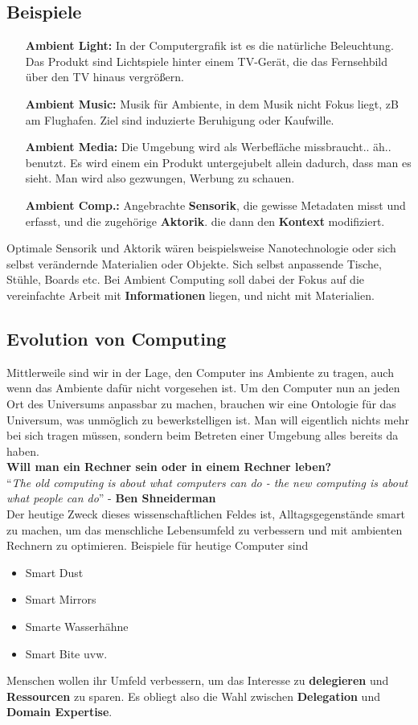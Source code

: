\documentclass[a4paper]{article}
\begin{document}
\subsection{Beispiele}
\begin{itemize}
	\item[\textbf{Ambient Light:}] In der Computergrafik ist es die natürliche Beleuchtung. Das Produkt sind Lichtspiele hinter einem TV-Gerät, die das Fernsehbild über den TV hinaus vergrößern.  
	\item[\textbf{Ambient Music:}] Musik für Ambiente, in dem Musik nicht Fokus liegt, zB am Flughafen. Ziel sind induzierte Beruhigung oder Kaufwille.
	\item[\textbf{Ambient Media:}] Die Umgebung wird als Werbefläche missbraucht.. äh.. benutzt. Es wird einem ein Produkt untergejubelt allein dadurch, dass man es sieht. Man wird also gezwungen, Werbung zu schauen.
	\item[\textbf{Ambient Comp.:}] Angebrachte \textbf{Sensorik}, die gewisse Metadaten misst und erfasst, und die zugehörige \textbf{Aktorik}. die dann den \textbf{Kontext} modifiziert. 
\end{itemize}
Optimale Sensorik und Aktorik wären beispielsweise Nanotechnologie oder sich selbst verändernde Materialien oder Objekte. Sich selbst anpassende Tische, Stühle, Boards etc. Bei Ambient Computing soll dabei der Fokus auf die vereinfachte Arbeit mit \textbf{Informationen} liegen, und nicht mit Materialien.
\subsection{Evolution von Computing}
Mittlerweile sind wir in der Lage, den Computer ins Ambiente zu tragen, auch wenn das Ambiente dafür nicht vorgesehen ist. Um den Computer nun an jeden Ort des Universums anpassbar zu machen, brauchen wir eine Ontologie für das Universum, was unmöglich zu bewerkstelligen ist.
Man will eigentlich nichts mehr bei sich tragen müssen, sondern beim Betreten einer Umgebung alles bereits da haben.  \\

\textbf{Will man ein Rechner sein oder in einem Rechner leben?}\\

``\textit{The old computing is about what computers can do - the new computing is about what people can do}'' - \textbf{Ben Shneiderman}\\

Der heutige Zweck dieses wissenschaftlichen Feldes ist, Alltagsgegenstände smart zu machen, um das menschliche Lebensumfeld zu verbessern und mit ambienten Rechnern zu optimieren. Beispiele für heutige Computer sind
\begin{itemize}
	\item Smart Dust
	\item Smart Mirrors
	\item Smarte Wasserhähne
	\item Smart Bite uvw.
\end{itemize}
Menschen wollen ihr Umfeld verbessern, um das Interesse zu \textbf{delegieren} und \textbf{Ressourcen} zu sparen. Es obliegt also die Wahl zwischen \textbf{Delegation} und \textbf{Domain Expertise}.\\
\end{document}
